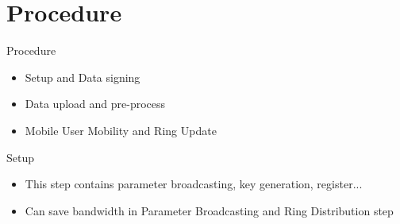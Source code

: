 \documentclass{beamer}
\begin{document}
\section{Procedure}
\begin{frame}{Procedure}
    \begin{itemize}
        \item {Setup and Data signing}
        \item {Data upload and pre-process}
        \item {Mobile User Mobility and Ring Update}
    \end{itemize}
\end{frame}
\begin{frame}{Setup}
    \begin{itemize}
        \item {This step contains parameter broadcasting, key generation, register...}
        \item {Can save bandwidth in Parameter Broadcasting and Ring Distribution step}
    \end{itemize}
\end{frame}
\end{document}
